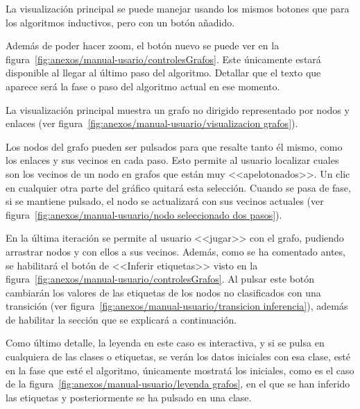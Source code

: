 
La visualización principal se puede manejar usando los mismos botones que para los algoritmos inductivos, pero con un botón añadido.


Además de poder hacer zoom, el botón nuevo se puede ver en la figura~\ref{fig:anexos/manual-usario/controlesGrafos}. Este únicamente estará disponible al llegar al último paso del algoritmo. Detallar que el texto que aparece será la fase o paso del algoritmo actual en ese momento.

La visualización principal muestra un grafo no dirigido representado por nodos y enlaces (ver figura~\ref{fig:anexos/manual-usuario/visualizacion grafos}).

Los nodos del grafo pueden ser pulsados para que resalte tanto él mismo, como los enlaces y sus vecinos en cada paso. Esto permite al usuario localizar cuales son los vecinos de un nodo en grafos que están muy <<apelotonados>>. Un clic en cualquier otra parte del gráfico quitará esta selección. Cuando se pasa de fase, si se mantiene pulsado, el nodo se actualizará con sus vecinos actuales (ver figura~\ref{fig:anexos/manual-usuario/nodo seleccionado dos pasos}).


En la última iteración se permite al usuario <<jugar>> con el grafo, pudiendo arrastrar nodos y con ellos a sus vecinos. Además, como se ha comentado antes, se habilitará el botón de <<Inferir etiquetas>> visto en la figura~\ref{fig:anexos/manual-usuario/controlesGrafos}. Al pulsar este botón cambiarán los valores de las etiquetas de los nodos no clasificados con una transición (ver figura~\ref{fig:anexos/manual-usuario/transicion inferencia}), además de habilitar la sección que se explicará a continuación.


Como último detalle, la leyenda en este caso es interactiva, y si se pulsa en cualquiera de las clases o etiquetas, se verán los datos iniciales con esa clase, esté en la fase que esté el algoritmo, únicamente mostratá los iniciales, como es el caso de la figura~\ref{fig:anexos/manual-usuario/leyenda grafos}, en el que se han inferido las etiquetas y posteriormente se ha pulsado en una clase.

